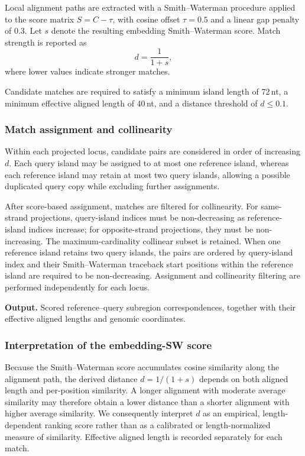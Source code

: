 Local alignment paths are extracted with a Smith--Waterman procedure
\citep{smithIdentificationCommonMolecular1981} applied to the score matrix
$S = C - \tau$, with cosine offset $\tau = 0.5$ and a linear gap penalty of
$0.3$. Let $s$ denote the resulting embedding Smith--Waterman score. Match
strength is reported as
\[
    d = \frac{1}{1+s},
\]
where lower values indicate stronger matches.

Candidate matches are required to satisfy a minimum island length of 72\,nt, a
minimum effective aligned length of 40\,nt, and a distance threshold of
$d \leq 0.1$.

\subsubsection{Match assignment and collinearity}

Within each projected locus, candidate pairs are considered in order of
increasing $d$. Each query island may be assigned to at most one reference
island, whereas each reference island may retain at most two query islands,
allowing a possible duplicated query copy while excluding further assignments.

After score-based assignment, matches are filtered for collinearity. For
same-strand projections, query-island indices must be non-decreasing as
reference-island indices increase; for opposite-strand projections, they must be
non-increasing. The maximum-cardinality collinear subset is retained. When one
reference island retains two query islands, the pairs are ordered by query-island
index and their Smith--Waterman traceback start positions within the reference
island are required to be non-decreasing.
Assignment and collinearity filtering are performed independently for each locus.

\textbf{Output.} Scored reference--query subregion correspondences, together with
their effective aligned lengths and genomic coordinates.

\subsubsection{Interpretation of the embedding-SW score}

Because the Smith--Waterman score accumulates cosine similarity along the
alignment path, the derived distance $d = 1/(1+s)$ depends on both aligned length
and per-position similarity. A longer alignment with moderate average similarity
may therefore obtain a lower distance than a shorter alignment with higher
average similarity. We consequently interpret $d$ as an empirical,
length-dependent ranking score rather than as a calibrated or length-normalized
measure of similarity. Effective aligned length is recorded separately for each
match.

